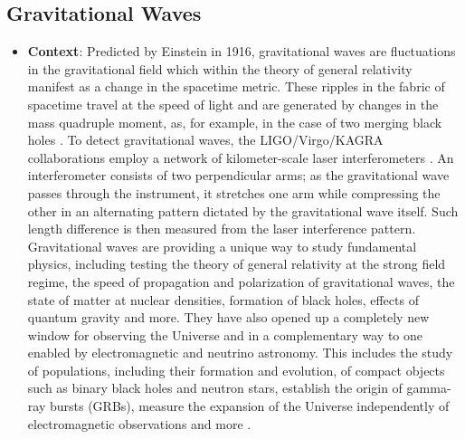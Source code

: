 


\subsection{Gravitational Waves}
    \begin{itemize}
        \item \textbf{Context}:
        Predicted by Einstein in 1916, gravitational waves are fluctuations in the gravitational field which within the theory of general relativity manifest as a change in the spacetime metric. 
        These ripples in the fabric of spacetime travel at the speed of light and are generated by changes in the mass quadruple moment, as, for example, in the case of two merging black holes \cite{PhysRevLett.116.061102}.
        To detect gravitational waves, the LIGO/Virgo/KAGRA collaborations employ a network of kilometer-scale laser interferometers \cite{aLIGO, Acernese_2014, Affeldt_2014, PhysRevD.88.043007}.
        An interferometer consists of two perpendicular arms;
        as the gravitational wave passes through the instrument, it stretches one arm while compressing the other in an alternating pattern dictated by the gravitational wave itself. 
        Such length difference is then measured from the laser interference pattern.
        Gravitational waves are providing a unique way to study fundamental physics, including testing the theory of general relativity at the strong field regime, the speed of propagation and polarization of gravitational waves, the state of matter at nuclear densities, formation of black holes, effects of quantum gravity and more.
        They have also opened up a completely new window for observing the Universe and in a complementary way to one enabled by electromagnetic and neutrino astronomy.
        This includes the study of populations, including their formation and evolution, of compact objects such as binary black holes and neutron stars, establish the origin of gamma-ray bursts (GRBs), measure the expansion of the Universe independently of electromagnetic observations and more \cite{PhysRevLett.119.161101}. 
        

\end{itemize}
